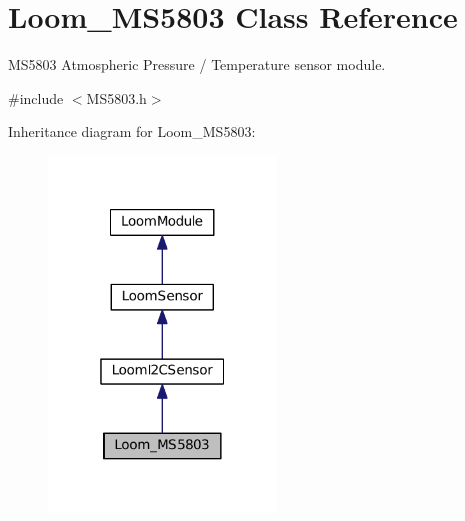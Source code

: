 \hypertarget{class_loom___m_s5803}{}\section{Loom\+\_\+\+M\+S5803 Class Reference}
\label{class_loom___m_s5803}


M\+S5803 Atmospheric Pressure / Temperature sensor module.  




{\ttfamily \#include $<$M\+S5803.\+h$>$}



Inheritance diagram for Loom\+\_\+\+M\+S5803\+:\nopagebreak
\begin{figure}[H]
\begin{center}
\leavevmode
\includegraphics[width=172pt]{class_loom___m_s5803__inherit__graph}
\end{center}
\end{figure}
